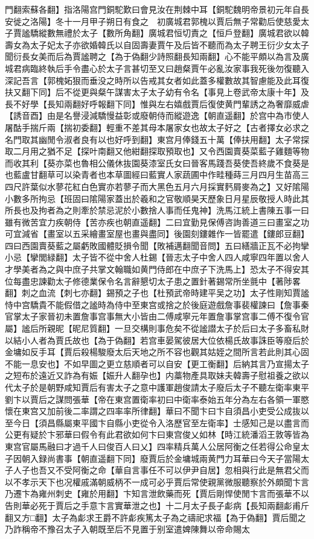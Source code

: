 門翻索蘇各翻】指洛陽宫門銅駝歎曰會見汝在荆棘中耳【銅駝魏明帝景初元年自長安徙之洛陽】冬十一月甲子朔日有食之　初廣城君郭槐以賈后無子常勸后使慈愛太子賈謐驕縱數無禮於太子【數所角翻】廣城君恒切責之【恒戶登翻】廣城君欲以韓壽女為太子妃太子亦欲婚韓氏以自固壽妻賈午及后皆不聽而為太子聘王衍少女太子聞衍長女美而后為賈謐聘之【為于偽翻少詩照翻長知兩翻】心不能平頗以為言及廣城君病臨終執后手令盡心於太子言甚切至又曰趙粲賈午必亂汝家事我死後勿復聽入深記吾言【郭槐妬狠而垂没之時所以告戒其女者如此蓋多權數故其智慮能及此耳復扶又翻下同】后不從更與粲午謀害太子太子幼有令名【事見上卷武帝太康十年】及長不好學【長知兩翻好呼報翻下同】惟與左右嬉戲賈后復使黄門輩誘之為奢靡威虐【誘音酉】由是名譽浸減驕慢益彰或廢朝侍而縱遊逸【朝直遥翻】於宫中為市使人屠酤手揣斤兩【揣初委翻】輕重不差其母本屠家女也故太子好之【古者擇女必求之名門取其幽閒令淑者良有以也好呼到翻】東宫月俸錢五十萬【俸扶用翻】太子常探取二月用之猶不足【探叶南翻又他紺翻探取預取也】又令西園賣葵菜藍子雞麵等物而收其利【葵亦菜也魯相公儀休抜園葵漆室氏女曰晉客馬踐吾葵使吾終歲不食葵是也藍盧甘翻草可以染青者也本草圖經曰藍實人家蔬圃中作畦種蒔三月四月生苗高三四尺許葉似水蓼花紅白色實亦若蓼子而大黑色五月六月採實麫屑麥為之】又好隂陽小數多所拘忌【班固曰隂陽家蓋出於羲和之官敬順昊天歷象日月星辰敬授人時此其所長也及拘者為之則牽於禁忌泥於小數捨人事而任鬼神】洗馬江統上書陳五事一曰雖有微苦宜力疾朝侍【苦亦疾也朝直遥翻】二曰宜勤見保傅咨詢善道三曰畫室之功可宜減省【畫室以五采繪畫室屋也畫與盡同】後園刻鏤雜作一皆罷遣【鏤郎豆翻】四曰西園賣葵藍之屬虧敗國體貶損令聞【敗補邁翻聞音問】五曰繕牆正瓦不必拘攣小忌【攣閭緑翻】太子皆不從中舍人杜錫【晉志太子中舍人四人咸寧四年置以舍人才學美者為之與中庶子共掌文翰職如黄門侍郎在中庶子下洗馬上】恐太子不得安其位每盡忠諫勸太子修德業保令名言辭懇切太子患之置針著錫常所坐氈中【著陟畧翻】刺之血流【刺七亦翻】錫預之子也【杜預武帝時建平吴之功】太子性剛知賈謐恃中宫驕貴不能假借之謐時為侍中至東宫或捨之於後庭遊戲詹事裴權諫曰【詹事秦官掌太子家晉初未置詹事宫事無大小皆由二傅咸寧元年置詹事掌宫事二傅不復令官屬】謐后所親昵【昵尼質翻】一旦交構則事危矣不從謐譛太子於后曰太子多畜私財以結小人者為賈氏故也【為于偽翻】若宫車晏駕彼居大位依楊氏故事誅臣等廢后於金墉如反手耳【賈后殺楊駿廢太后天地之所不容也觀其姑姪之間所言若此則其心固不能一息安也】不如早圖之更立慈順者可以自安【更工衡翻】后納其言乃宣揚太子之短布於遠近又詐為有娠【娠升人翻孕也】内藁物產具取妹夫韓壽子慰祖養之欲以代太子於是朝野咸知賈后有害太子之意中護軍趙俊請太子廢后太子不聽左衛率東平劉卞以賈后之謀問張華【帝在東宫置衛率初曰中衛率泰始五年分為左右各領一軍愍懷在東宫又加前後二率謂之四率率所律翻】華曰不聞卞曰卞自須昌小吏受公成抜以至今日【須昌縣屬東平國卞自縣小吏從令入洛歷官至左衛率】士感知己是以盡言而公更有疑於卞邪華曰假令有此君欲如何卞曰東宫俊乂如林【時江統潘滔王敦等皆為東宫官屬馬融曰才過千人曰俊百人曰乂】四率精兵萬人公居阿衡之任若得公命皇太子因朝入録尚書事【朝直遥翻下同】廢賈后於金墉城兩黄門力耳華曰今天子當陽太子人子也吾又不受阿衡之命【華自言事任不可以伊尹自居】忽相與行此是無君父而以不孝示天下也况權戚滿朝威柄不一成可必乎賈后常使親黨微服聽察於外頗聞卞言乃遷卞為雍州刺史【雍於用翻】卞知言泄飲藥而死【賈后剛悍使閒卞言而張華不以告則華必死于賈后之手意卞言實華泄之也】十二月太子長子虨病【長知兩翻虨甫斤翻又方□翻】太子為虨求王爵不許虨疾篤太子為之禱祀求福【為于偽翻】賈后聞之乃詐稱帝不豫召太子入朝既至后不見置于别室遣婢陳舞以帝命賜太